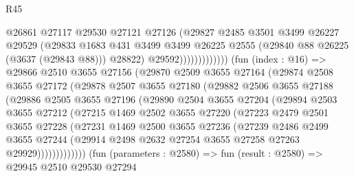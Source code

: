 \begin{lexlean}{R45}
\begin{coremodule}
                                @26861
                                @27117
                                @29530
                                @27121
                                @27126
                                (@29827
                                  @2485
                                  @3501
                                  @3499
                                  @26227
                                  @29529
                                  (@29833
                                    @1683
                                    @431
                                    @3499
                                    @3499
                                    @26225
                                    @2555
                                    (@29840 @88 @26225 (@3637 (@29843 @88)))
                                    @28822)
                                  @29592)))))))))))))
        (fun (index : @16) =>
        @29866
          @2510
          @3655
          @27156
          (@29870
            @2509
            @3655
            @27164
            (@29874
              @2508
              @3655
              @27172
              (@29878
                @2507
                @3655
                @27180
                (@29882
                  @2506
                  @3655
                  @27188
                  (@29886
                    @2505
                    @3655
                    @27196
                    (@29890
                      @2504
                      @3655
                      @27204
                      (@29894
                        @2503
                        @3655
                        @27212
                        (@27215
                          @1469
                          @2502
                          @3655
                          @27220
                          (@27223
                            @2479
                            @2501
                            @3655
                            @27228
                            (@27231
                              @1469
                              @2500
                              @3655
                              @27236
                              (@27239
                                @2486
                                @2499
                                @3655
                                @27244
                                (@29914 @2498 @2632 @27254 @3655 @27258 @27263 @29929)))))))))))))
        (fun (parameters : @2580) =>
        fun (result : @2580) =>
        @29945
          @2510
          @29530
          @27294

\end{coremodule}
\end{lexlean}
